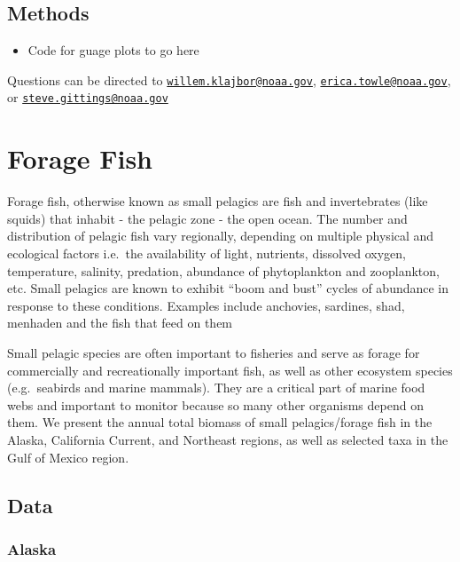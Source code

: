 \documentclass[
]{book}
\providecommand{\tightlist}{%
  \setlength{\itemsep}{0pt}\setlength{\parskip}{0pt}}
\begin{document}
\hypertarget{methods-1}{%
\section{Methods}\label{methods-1}}

\begin{itemize}
\tightlist
\item
  Code for guage plots to go here
\end{itemize}

Questions can be directed to \href{mailto:willem.klajbor@noaa.gov}{\nolinkurl{willem.klajbor@noaa.gov}}, \href{mailto:erica.towle@noaa.gov}{\nolinkurl{erica.towle@noaa.gov}}, or \href{mailto:steve.gittings@noaa.gov}{\nolinkurl{steve.gittings@noaa.gov}}

\hypertarget{forage-fish}{%
\chapter{Forage Fish}\label{forage-fish}}

Forage fish, otherwise known as small pelagics are fish and invertebrates (like squids) that inhabit - the pelagic zone - the open ocean. The number and distribution of pelagic fish vary regionally, depending on multiple physical and ecological factors i.e.~the availability of light, nutrients, dissolved oxygen, temperature, salinity, predation, abundance of phytoplankton and zooplankton, etc. Small pelagics are known to exhibit ``boom and bust'' cycles of abundance in response to these conditions. Examples include anchovies, sardines, shad, menhaden and the fish that feed on them

Small pelagic species are often important to fisheries and serve as forage for commercially and recreationally important fish, as well as other ecosystem species (e.g.~seabirds and marine mammals). They are a critical part of marine food webs and important to monitor because so many other organisms depend on them. We present the annual total biomass of small pelagics/forage fish in the Alaska, California Current, and Northeast regions, as well as selected taxa in the Gulf of Mexico region.

\hypertarget{data-2}{%
\section{Data}\label{data-2}}

\hypertarget{alaska}{%
\subsection{Alaska}\label{alaska}}
\end{document}
